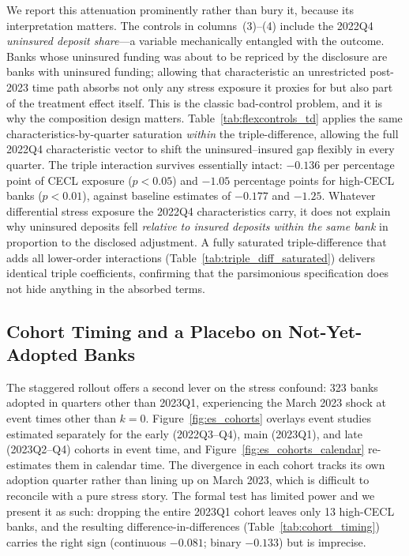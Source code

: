 We report this attenuation prominently rather than bury it, because its
interpretation matters.  The controls in columns~(3)--(4) include the 2022Q4
\emph{uninsured deposit share}---a variable mechanically entangled with the
outcome.  Banks whose uninsured funding was about to be repriced by the
disclosure are banks with uninsured funding; allowing that characteristic an
unrestricted post-2023 time path absorbs not only any stress exposure it
proxies for but also part of the treatment effect itself.  This is the
classic bad-control problem, and it is why the composition design matters.
Table~\ref{tab:flexcontrols_td} applies the same characteristics-by-quarter
saturation \emph{within} the triple-difference, allowing the full 2022Q4
characteristic vector to shift the uninsured--insured gap flexibly in every
quarter.  The triple interaction survives essentially intact: $-0.136$ per
percentage point of CECL exposure ($p < 0.05$) and $-1.05$ percentage points
for high-CECL banks ($p < 0.01$), against baseline estimates of $-0.177$ and
$-1.25$.  Whatever differential stress exposure the 2022Q4 characteristics
carry, it does not explain why uninsured deposits fell \emph{relative to
insured deposits within the same bank} in proportion to the disclosed
adjustment.  A fully saturated triple-difference that adds all lower-order
interactions (Table~\ref{tab:triple_diff_saturated}) delivers identical
triple coefficients, confirming that the parsimonious specification does not
hide anything in the absorbed terms.

\subsection{Cohort Timing and a Placebo on Not-Yet-Adopted Banks}
\label{sec:robustness:timing}

The staggered rollout offers a second lever on the stress confound: 323
banks adopted in quarters other than 2023Q1, experiencing the March 2023
shock at event times other than $k = 0$.
Figure~\ref{fig:es_cohorts} overlays event studies estimated separately for
the early (2022Q3--Q4), main (2023Q1), and late (2023Q2--Q4) cohorts in
event time, and Figure~\ref{fig:es_cohorts_calendar} re-estimates them in
calendar time.  The divergence in each cohort tracks its own adoption
quarter rather than lining up on March 2023, which is difficult to reconcile
with a pure stress story.  The formal test has limited power and we present
it as such: dropping the entire 2023Q1 cohort leaves only 13 high-CECL banks,
and the resulting difference-in-differences (Table~\ref{tab:cohort_timing})
carries the right sign (continuous $-0.081$; binary $-0.133$) but is
imprecise.

